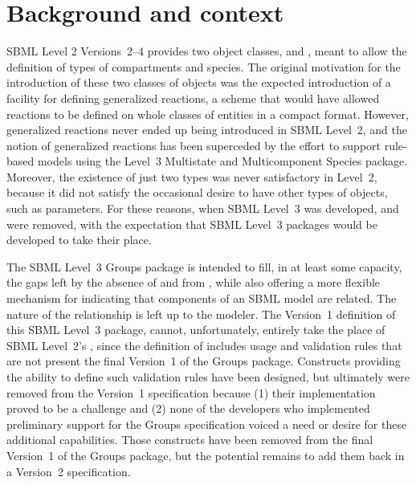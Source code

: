 
\section{Background and context}
\label{background}

SBML Level 2 Versions~2--4 provides two object classes, \CompartmentType and \SpeciesType, meant to allow the definition of types of compartments and species. The original motivation for the introduction of these two classes of objects was the expected introduction of a facility for defining generalized reactions, a scheme that would have allowed reactions to be defined on whole classes of entities in a compact format. However, generalized reactions never ended up being introduced in SBML Level~2, and the notion of generalized reactions has been superceded by the effort to support rule-based models using the Level~3 Multistate and Multicomponent Species package.  Moreover, the existence of just two types was never satisfactory in Level~2, because it did not satisfy the occasional desire to have other types of objects, such as parameters.  For these reasons, when SBML Level~3 was developed, \CompartmentType and \SpeciesType were removed, with the expectation that SBML Level~3 packages would be developed to take their place.

The SBML Level~3 Groups package is intended to fill, in at least some capacity, the gaps left by the absence of \CompartmentType and \SpeciesType from \sbmlthreecore, while also offering a more flexible mechanism for indicating that components of an SBML model are related.  The nature of the relationship is left up to the modeler.  The Version~1 definition of this SBML Level~3 package, cannot, unfortunately, entirely take the place of SBML Level~2's \SpeciesType, since the definition of \SpeciesType includes usage and validation rules that are not present the final Version~1 of the Groups package.  Constructs providing the ability to define such validation rules have been designed, but ultimately were removed from the Version~1 specification because (1) their implementation proved to be a challenge and (2) none of the developers who implemented preliminary support for the Groups specification voiced a need or desire for these additional capabilities.  Those constructs have been removed from the final Version~1 of the Groups package, but the potential remains to add them back in a Version~2 specification.

